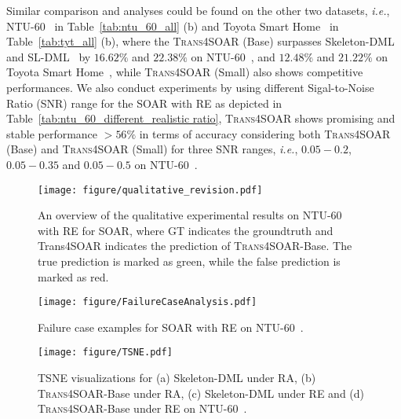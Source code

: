 \documentclass[lettersize,journal]{IEEEtran}
\begin{document}
Similar comparison and analyses could be found on the other two datasets, \textit{i.e.}, NTU-60~\cite{shahroudy2016ntu} in Table~\ref{tab:ntu_60_all} (b) and Toyota Smart Home~\cite{Das_2019_ICCV} in Table~\ref{tab:tyt_all} (b), where the \textsc{Trans4SOAR} (Base) surpasses Skeleton-DML~\cite{memmesheimer2020skeleton_dml} and SL-DML~\cite{memmesheimer2021sl} by $16.62\%$ and $22.38\%$  on NTU-60~\cite{shahroudy2016ntu}, and $12.48\%$ and $21.22\%$ on Toyota Smart Home~\cite{Das_2019_ICCV}, while \textsc{Trans4SOAR} (Small) also shows competitive performances. We also conduct experiments by using different Sigal-to-Noise Ratio (SNR) range for the SOAR with RE as depicted in Table~\ref{tab:ntu_60_different_realistic ratio}, \textsc{Trans4SOAR} shows promising and stable performance $>56\%$ in terms of accuracy considering both \textsc{Trans4SOAR} (Base) and \textsc{Trans4SOAR} (Small) for three SNR ranges, \textit{i.e.}, $0.05-0.2$, $0.05-0.35$ and $0.05-0.5$ on NTU-60~\cite{shahroudy2016ntu}. 
\begin{figure*}[t]
\begin{center}
\texttt{[image: figure/qualitative\_revision.pdf]}
\end{center}
\caption{An overview of the qualitative experimental results  on NTU-60~\cite{shahroudy2016ntu} with RE for SOAR, where GT indicates the groundtruth and Trans4SOAR indicates the prediction of \textsc{Trans4SOAR}-Base. The true prediction is marked as green, while the false prediction is marked as red. }

\label{fig:qualitative}
\end{figure*}
\begin{figure}[t]
\begin{center}
\texttt{[image: figure/FailureCaseAnalysis.pdf]}
\end{center}
\caption{Failure case examples for SOAR with RE on NTU-60~\cite{shahroudy2016ntu}.}
\label{fig:failure_case}
\end{figure}
\begin{figure}[t]
\begin{center}
\texttt{[image: figure/TSNE.pdf]}
\end{center}
\caption{TSNE visualizations for (a) Skeleton-DML under RA, (b) \textsc{Trans4SOAR}-Base under RA, (c) Skeleton-DML under RE and (d) \textsc{Trans4SOAR}-Base under RE on NTU-60~\cite{shahroudy2016ntu}.}
\label{fig:tsne_case}
\end{figure}
\end{document}
